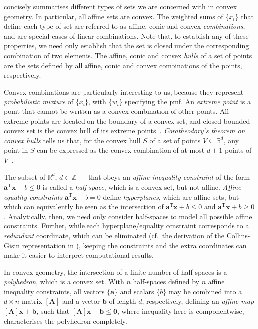 \documentclass[10pt, a4paper]{article}
\numberwithin{equation}{section} %
\theoremstyle{definition}
\theoremstyle{plain}
\newcommand{\?}{\mathrel{?}} %
\newcommand{\Z}{\mathbb{Z}} %
\newcommand{\R}{\mathbb{R}} %
\newcommand{\tpose}{\mathrm{T}}
\newcommand{\cvec}[1]{\boldsymbol{\mathbf{#1}}}    %
\newcommand{\rvec}[1]{\boldsymbol{\mathbf{#1}}^\tpose} %
\newcommand{\matr}[2][]{\left[\mathbf{#2}#1\right]} %
\begin{document}
\begin{appendices}
                     concisely summarises different types of sets we are concerned with in convex geometry. In particular, all affine sets are convex. The weighted sums of \(\{x_i\}\) that define each type of set are referred to as affine, conic and convex \emph{combinations}, and are special cases of linear combinations. Note that, to establish any of these properties, we need only establish that the set is closed under the corresponding combination of two elements. The affine, conic and convex \emph{hulls} of a set of points are the sets defined by all affine, conic and convex combinations of the points, respectively.

                    Convex combinations are particularly interesting to us, because they represent \emph{probabilistic mixture} of \(\{x_i\}\), with \(\{w_i\}\) specifying the pmf. An \emph{extreme point} is a point that cannot be written as a convex combination of other points. All extreme points are located on the boundary of a convex set, and closed bounded convex set is the convex hull of its extreme points~\cite[Ch. B.4]{LuenbergerYe}. \emph{Caratheodory's theorem on convex hulls} tells us that, for the convex hull \(S\) of a set of points \(V \subseteq \R^{d}\), any point in \(S\) can be expressed as the convex combination of at most \(d+1\) points of \(V\)~\cite{Caratheodory,CaratheodorySteinitz}.

                    The subset of \(\R^d\), \(d \in \Z_{++}\) that obeys an \emph{affine inequality constraint} of the form \(\rvec{a}\cvec{x} - b \leq 0\) is called a \emph{half-space}, which is a convex set, but not affine. \emph{Affine equality constraints} \(\rvec{a}\cvec{x} + b = 0\) define \emph{hyperplanes}, which are affine sets, but which can equivalently be seen as the intersection of \(\rvec{a}\cvec{x} + b \leq 0\) and \(\rvec{a}\cvec{x} + b \geq 0\). Analytically, then, we need only consider half-spaces to model all possible affine constraints. Further, while each hyperplane/equality constraint corresponds to a \emph{redundant} coordinate, which can be eliminated (cf.\ the derivation of the Collins-Gisin representation in ), keeping the constraints and the extra coordinates can make it easier to interpret computational results.

                    In convex geometry, the intersection of a finite number of half-spaces is a \emph{polyhedron}, which is a convex set. With \(n\) half-spaces defined by \(n\) affine inequality constraints, all vectors \(\{\cvec{a}\}\) and scalars \(\{b\}\) may be combined into a \(d\times{n}\) matrix \(\matr{A}\) and a vector \(\cvec{b}\) of length \(d\), respectively, defining an \emph{affine map} \(\matr{A}\cvec{x} + \cvec{b}\), such that \(\matr{A}\cvec{x} + \cvec{b} \leq \cvec{0}\), where inequality here is componentwise, characterises the polyhedron completely.


\end{appendices}
\end{document}
